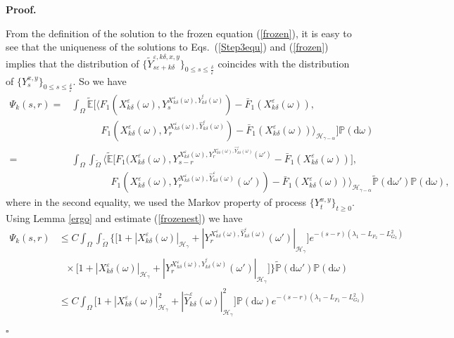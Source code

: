 \documentclass[10pt,a4paper]{article}
\numberwithin{equation}{section}
\newenvironment{proof}[1][\normalfont\bfseries Proof]{%
	\noindent #1.\hspace{0.5em}%
	\ignorespaces%
}{%
	\hfill $\square$%
	\par%
}
\begin{document}
\begin{proof}
From the definition of the solution to the frozen equation (\ref{frozen}),
it is easy to see that the uniqueness of the solutions to Eqs.~(\ref{Step3equ}) and (\ref{frozen}) implies that the distribution of $\{\widetilde{Y}^{\varepsilon,k\delta,x,y}_{s\varepsilon+k\delta}\}_{0\leq s\leq \frac \delta\varepsilon}$ coincides with the distribution of $\{Y^{x,y}_s\}_{0\leq s\leq \frac \delta\varepsilon}$. So we have
\begin{align*}
	\Psi_k(s,r)=&\int_\Omega \widetilde{\mathbb E} \Big[ \big\langle F_1(X^\varepsilon_{k\delta}(\omega),Y^{X^\varepsilon_{k\delta}(\omega),
		\hat{Y}^\varepsilon_{k\delta}(\omega)}_s)-\bar{F}_1(X^\varepsilon_{k\delta}(\omega)),\\
	&\qquad\quad F_1(X^\varepsilon_{k\delta}(\omega),Y^{X^\varepsilon_{k\delta}(\omega),
		\hat{Y}^\varepsilon_{k\delta}(\omega)}_r)-\bar{F}_1(X^\varepsilon_{k\delta}(\omega)) \big\rangle_{\mathcal H_{\gamma-\alpha}}\Big] \mathbb P(\mathrm{d} \omega)\\
	=&\int_\Omega\int_{\widetilde{\Omega}}\Big\langle \widetilde{\mathbb E} \Big[F_1(X^\varepsilon_{k\delta}(\omega),Y^{X^\varepsilon_{k\delta}(\omega),
		Y^{X^\varepsilon_{k\delta}(\omega),\hat{Y}^\varepsilon_{k\delta}(\omega)}_r(\omega')}_{s-r}-
	\bar{F}_1(X^\varepsilon_{k\delta}(\omega))\Big],\\
	&\qquad\qquad F_1(X^\varepsilon_{k\delta}(\omega),Y^{X^\varepsilon_{k\delta}(\omega),
		\hat{Y}^\varepsilon_{k\delta}(\omega)}_r(\omega'))-\bar{F}_1(X^\varepsilon_{k\delta}(\omega))\Big\rangle_{\mathcal H_{\gamma-\alpha}}
	\widetilde{\mathbb P}(\mathrm{d} \omega')\mathbb P(\mathrm{d} \omega),	
\end{align*}
where in the second equality, we used the Markov property of process $\{Y^{x,y}_t\}_{t\geq 0}$.
Using Lemma \ref{ergo} and estimate (\ref{frozenest}) we have
\begin{align*}
	\Psi_k(s,r)
	&\leq C\int_\Omega \int_{\widetilde{\Omega}}\Big\{\Big[1+|X^\varepsilon_{k\delta}(\omega)|_{\mathcal H_\gamma }+|Y^{X^\varepsilon_{k\delta}(\omega),
		\hat{Y}^\varepsilon_{k\delta}(\omega)}_r(\omega')|_{\mathcal H_\gamma }\Big]  e^{-(s-r)(\lambda_1-L_{F_2}-L_{G_2}^2)}  \nonumber\\
	&~~~\times\Big[1+|X^\varepsilon_{k\delta}(\omega)|_{\mathcal H_\gamma }+|Y^{X^\varepsilon_{k\delta}(\omega),
		\hat{Y}^\varepsilon_{k\delta}(\omega)}_r(\omega')|_{\mathcal H_\gamma }\Big]\Big\}\widetilde{\mathbb
		P}(\mathrm{d} \omega')\mathbb P(\mathrm{d} \omega)  \nonumber\\
	&\leq C\int_\Omega\Big[1+|X^\varepsilon_{k\delta}(\omega)|_{\mathcal H_\gamma }^2+|\hat{Y}^\varepsilon_{k\delta}(\omega)|_{\mathcal H_\gamma }^2\Big]\mathbb P(\mathrm{d} \omega) e^{-(s-r)(\lambda_1-L_{F_2}-L_{G_2}^2)}   \nonumber\\

\end{align*}
\end{proof}
\end{document}
